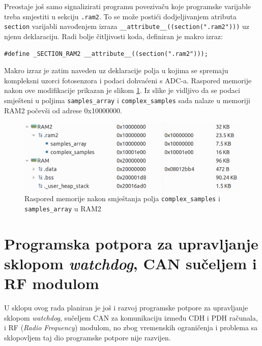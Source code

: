 Preostaje još samo signalizirati programu povezivaču koje programske varijable treba smjestiti u sekciju \texttt{.ram2}. To se može postići dodjeljivanjem atributa \texttt{section} varijabli navođenjem izraza \texttt{\_\_attribute\_\_((section(".ram2")))} uz njenu deklaraciju. Radi bolje čitljivosti koda, definiran je makro izraz:

\begin{lstlisting}[caption={Makro izraz za dodjelu atributa \texttt{section} programskim varijablama}]
#define _SECTION_RAM2 __attribute__((section(".ram2")));
\end{lstlisting}

Makro izraz je zatim naveden uz deklaracije polja u kojima se spremaju kompleksni uzorci fotosenzora i podaci dohvaćeni s ADC-a. Raspored memorije nakon ove modifikacije prikazan je slikom \ref{fig:memorija}. Iz slike je vidljivo da se podaci smješteni u poljima \texttt{samples\_array} i \texttt{complex\_samples} sada nalaze u memoriji RAM2 počevši od adrese 0x10000000.

\begin{figure}[htb]
    \centering
    \includegraphics[width=\textwidth]{slike/memorija.png}
    \caption{Raspored memorije nakon smještanja polja \texttt{complex\_samples} i \texttt{samples\_array} u RAM2}
    \label{fig:memorija}
\end{figure}

\section{Programska potpora za upravljanje sklopom \textit{watchdog}, CAN sučeljem i RF modulom}

U sklopu ovog rada planiran je još i razvoj programske potpore za upravljanje sklopom \textit{watchdog}, sučeljem CAN za komunikaciju između CDH i PDH računala, i RF (\textit{Radio Frequency}) modulom, no zbog vremenskih ograničenja i problema sa sklopovljem taj dio programske potpore nije razvijen.

